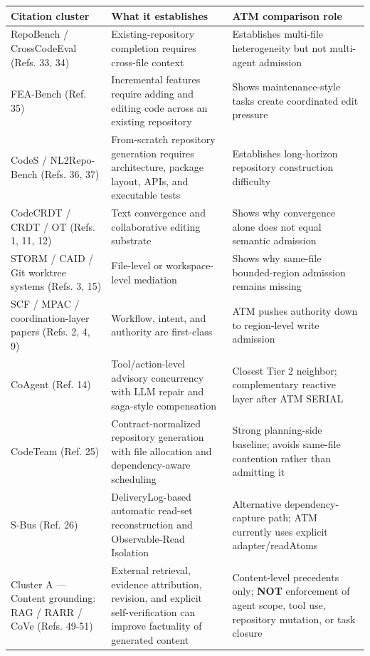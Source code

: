 \documentclass[a4paper,fontset=none]{ctexart}
\begin{document}
\begingroup
\footnotesize
{}
\begin{longtable}{L{0.28\textwidth}L{0.28\textwidth}L{0.28\textwidth}}
\toprule
Citation cluster & What it establishes & ATM comparison role \\
\midrule
RepoBench / CrossCodeEval (Refs. 33, 34) & Existing-repository completion requires cross-file context & Establishes multi-file heterogeneity but not multi-agent admission \\
FEA-Bench (Ref. 35) & Incremental features require adding and editing code across an existing repository & Shows maintenance-style tasks create coordinated edit pressure \\
CodeS / NL2Repo-Bench (Refs. 36, 37) & From-scratch repository generation requires architecture, package layout, APIs, and executable tests & Establishes long-horizon repository construction difficulty \\
CodeCRDT / CRDT / OT (Refs. 1, 11, 12) & Text convergence and collaborative editing substrate & Shows why convergence alone does not equal semantic admission \\
STORM / CAID / Git worktree systems (Refs. 3, 15) & File-level or workspace-level mediation & Shows why same-file bounded-region admission remains missing \\
SCF / MPAC / coordination-layer papers (Refs. 2, 4, 9) & Workflow, intent, and authority are first-class & ATM pushes authority down to region-level write admission \\
CoAgent (Ref. 14) & Tool/action-level advisory concurrency with LLM repair and saga-style compensation & Closest Tier 2 neighbor; complementary reactive layer after ATM SERIAL \\
CodeTeam (Ref. 25) & Contract-normalized repository generation with file allocation and dependency-aware scheduling & Strong planning-side baseline; avoids same-file contention rather than admitting it \\
S-Bus (Ref. 26) & DeliveryLog-based automatic read-set reconstruction and Observable-Read Isolation & Alternative dependency-capture path; ATM currently uses explicit adapter/readAtoms \\
Cluster A --- Content grounding: RAG / RARR / CoVe (Refs. 49-51) & External retrieval, evidence attribution, revision, and explicit self-verification can improve factuality of generated content & Content-level precedents only; \textbf{NOT} enforcement of agent scope, tool use, repository mutation, or task closure \\

\end{longtable}
\end{document}
